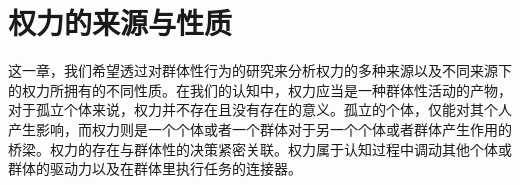 \documentclass[main.tex]{subfiles}
\begin{document}
\chapter{权力的来源与性质}
这一章，我们希望透过对群体性行为的研究来分析权力的多种来源以及不同来源下的权力所拥有的不同性质。在我们的认知中，权力应当是一种群体性活动的产物，对于孤立个体来说，权力并不存在且没有存在的意义。孤立的个体，仅能对其个人产生影响，而权力则是一个个体或者一个群体对于另一个个体或者群体产生作用的桥梁。权力的存在与群体性的决策紧密关联。权力属于认知过程中调动其他个体或群体的驱动力以及在群体里执行任务的连接器。






\end{document}
